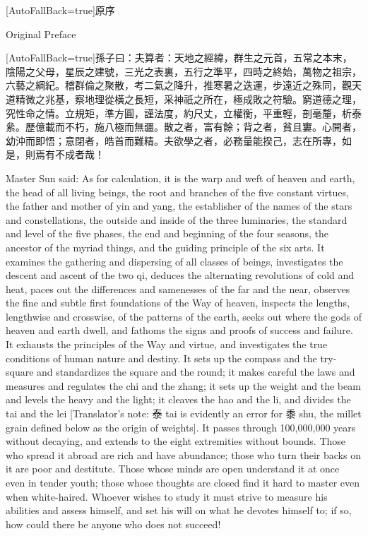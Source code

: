 \documentclass[11pt]{article}
\newcommand{\unitlabel}[1]{\marginpar{\raggedleft\tiny\color{gray}#1}}
\newenvironment{unitzh}{\par\CJKfontspec{Noto Serif CJK SC}[AutoFallBack=true]\large\linespread{1.25}\selectfont}{\par}
\newenvironment{uniten}{\par\small\color{black!85}}{\par\medskip}
\begin{document}
\begin{unitzh}\unitlabel{sunzi-001.6}原序\end{unitzh}
\begin{uniten}Original Preface\end{uniten}

\begin{unitzh}\unitlabel{sunzi-001.7}孫子曰：夫算者：天地之經緯，群生之元首，五常之本末，陰陽之父母，星辰之建號，三光之表裏，五行之準平，四時之終始，萬物之祖宗，六藝之綱紀。稽群倫之聚散，考二氣之降升，推寒暑之迭運，步遠近之殊同，觀天道精微之兆基，察地理從橫之長短，采神祇之所在，極成敗之符驗。窮道德之理，究性命之情。立規矩，準方圓，謹法度，約尺丈，立權衡，平重輕，剖毫釐，析泰絫。歷億載而不朽，施八極而無疆。散之者，富有餘；背之者，貧且寠。心開者，幼沖而即悟；意閉者，皓首而難精。夫欲學之者，必務量能揆己，志在所專，如是，則焉有不成者哉！\end{unitzh}
\begin{uniten}Master Sun said: As for calculation, it is the warp and weft of heaven and earth, the head of all living beings, the root and branches of the five constant virtues, the father and mother of yin and yang, the establisher of the names of the stars and constellations, the outside and inside of the three luminaries, the standard and level of the five phases, the end and beginning of the four seasons, the ancestor of the myriad things, and the guiding principle of the six arts. It examines the gathering and dispersing of all classes of beings, investigates the descent and ascent of the two qi, deduces the alternating revolutions of cold and heat, paces out the differences and samenesses of the far and the near, observes the fine and subtle first foundations of the Way of heaven, inspects the lengths, lengthwise and crosswise, of the patterns of the earth, seeks out where the gods of heaven and earth dwell, and fathoms the signs and proofs of success and failure. It exhausts the principles of the Way and virtue, and investigates the true conditions of human nature and destiny. It sets up the compass and the try-square and standardizes the square and the round; it makes careful the laws and measures and regulates the chi and the zhang; it sets up the weight and the beam and levels the heavy and the light; it cleaves the hao and the li, and divides the tai and the lei [Translator's note: 泰 tai is evidently an error for 黍 shu, the millet grain defined below as the origin of weights]. It passes through 100,000,000 years without decaying, and extends to the eight extremities without bounds. Those who spread it abroad are rich and have abundance; those who turn their backs on it are poor and destitute. Those whose minds are open understand it at once even in tender youth; those whose thoughts are closed find it hard to master even when white-haired. Whoever wishes to study it must strive to measure his abilities and assess himself, and set his will on what he devotes himself to; if so, how could there be anyone who does not succeed!\end{uniten}
\end{document}
